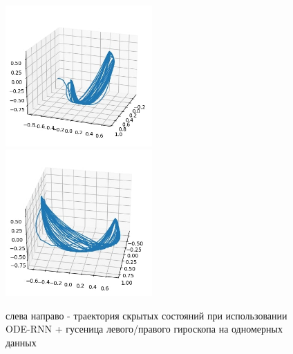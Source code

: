 \documentclass[12pt, twoside]{article}
\begin{document}
\begin{figure}[h!]
	\includegraphics[width = 0.5\textwidth]{images/trajectory_left.jpg} \hfill
	\includegraphics[width = 0.5\textwidth]{images/trajectory_right.jpg}
	\caption{слева направо - траектория скрытых состояний при использовании ODE-RNN + гусеница левого/правого гироскопа на одномерных данных}
	\label{trajectory_hidden}
\end{figure}	
\end{document}
